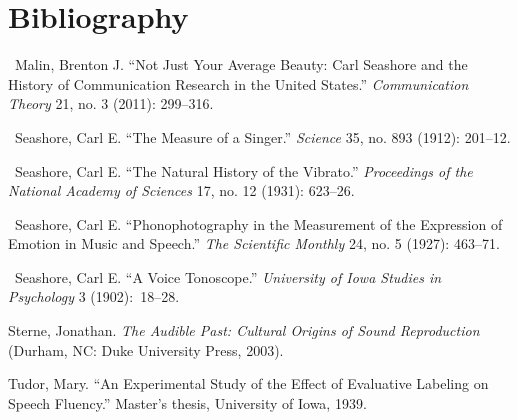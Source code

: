 \documentclass{tufte-handout}
\begin{document}
\section{Bibliography}\label{bibliography}

\begin{hangparas}{.25in}{1} 



~Malin, Brenton J. ``Not Just Your Average Beauty: Carl Seashore and the
History of Communication Research in the United States.''
\emph{Communication Theory} 21, no. 3 (2011): 299--316.

~Seashore, Carl E. ``The Measure of a Singer.'' \emph{Science} 35, no.
893 (1912): 201--12.

~Seashore, Carl E. ``The Natural History of the Vibrato.''
\emph{Proceedings of the National Academy of Sciences} 17, no. 12
(1931): 623--26.

~Seashore, Carl E. ``Phonophotography in the Measurement of the
Expression of Emotion in Music and Speech.'' \emph{The Scientific
Monthly} 24, no. 5 (1927): 463--71.

~Seashore, Carl E. ``A Voice Tonoscope.'' \emph{University of Iowa
Studies in Psychology} 3 (1902):~18--28.

Sterne, Jonathan. \emph{The Audible Past: Cultural Origins of Sound
Reproduction} (Durham, NC: Duke University Press, 2003).

Tudor, Mary. ``An Experimental Study of the Effect of Evaluative
Labeling on Speech Fluency.'' Master's thesis, University of Iowa, 1939.



\end{hangparas}
\end{document}

